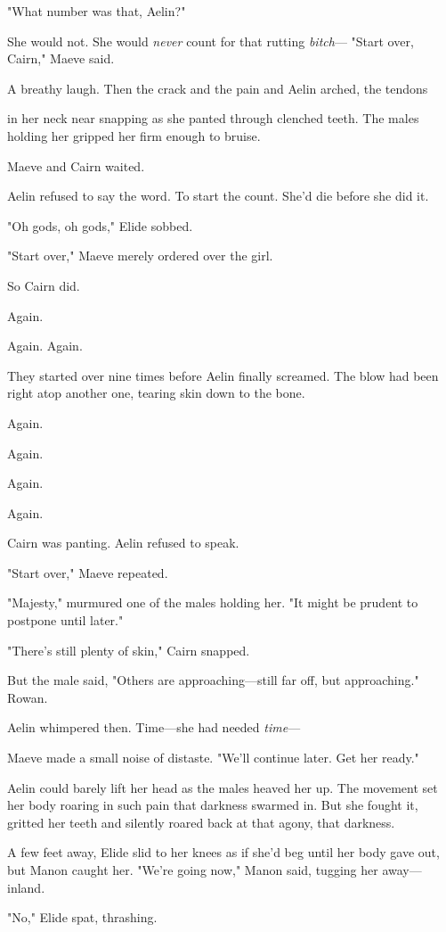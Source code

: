 "What number was that, Aelin?"

She would not. She would \emph{never} count for that rutting
\emph{bitch}--- "Start over, Cairn," Maeve said.

A breathy laugh. Then the crack and the pain and Aelin arched, the tendons

in her neck near snapping as she panted through clenched teeth. The males holding her gripped her firm enough to bruise.

Maeve and Cairn waited.

Aelin refused to say the word. To start the count. She'd die before she did it.

"Oh gods, oh gods," Elide sobbed.

"Start over," Maeve merely ordered over the girl.

So Cairn did.

Again.

Again. Again.

They started over nine times before Aelin finally screamed. The blow had been right atop another one, tearing skin down to the bone.

Again.

Again.

Again.

Again.

Cairn was panting. Aelin refused to speak.

"Start over," Maeve repeated.

"Majesty," murmured one of the males holding her. "It might be prudent to postpone until later."

"There's still plenty of skin," Cairn snapped.

But the male said, "Others are approaching---still far off, but approaching." Rowan.

Aelin whimpered then. Time---she had needed \emph{time}---

Maeve made a small noise of distaste. "We'll continue later. Get her ready."

Aelin could barely lift her head as the males heaved her up. The movement set her body roaring in such pain that darkness swarmed in. But she fought it, gritted her teeth and silently roared back at that agony, that darkness.

A few feet away, Elide slid to her knees as if she'd beg until her body gave out, but Manon caught her. "We're going now," Manon said, tugging her away--- inland.

"No," Elide spat, thrashing.

